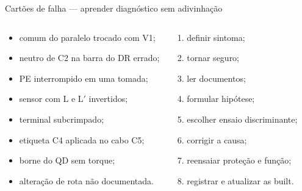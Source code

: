 \begin{frame}{Cartões de falha — aprender diagnóstico sem adivinhação}
\small
\begin{columns}[T,onlytextwidth]
\begin{caixaFix}[title=Falhas possíveis]
\begin{itemize}
\item comum do paralelo trocado com V1;
\item neutro de C2 na barra do DR errado;
\item PE interrompido em uma tomada;
\item sensor com L e L$'$ invertidos;
\item terminal subcrimpado;
\item etiqueta C4 aplicada no cabo C5;
\item borne do QD sem torque;
\item alteração de rota não documentada.
\end{itemize}
\end{caixaFix}
\begin{caixaProjeto}[title=Método obrigatório]
\begin{enumerate}
\item definir sintoma;
\item tornar seguro;
\item ler documentos;
\item formular hipótese;
\item escolher ensaio discriminante;
\item corrigir a causa;
\item reensaiar proteção e função;
\item registrar e atualizar as built.
\end{enumerate}
\end{caixaProjeto}
\end{columns}
\end{frame}

